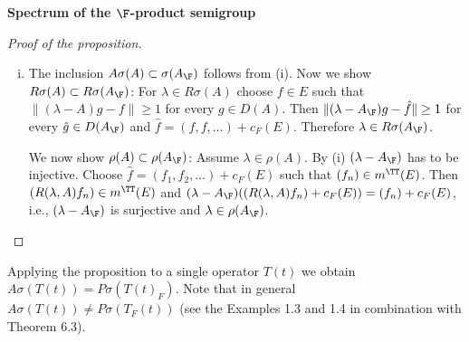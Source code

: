 \begin{example}{\textbf{Spectrum of the $\F$-product semigroup}}
\begin{proof}[Proof of the proposition]
\begin{enumerate}[(i), wide]
By the considerations in A-I,3.6 we can represent each $\hat{f}^{m}$ as a normalized sequence $(f_{n}^{m})_{n \in \N}$ in $D(A)$ such that
\[
\lim_{m \to \infty} \limsup_{n \to \infty} \|(\lambda-A)f_{n}^{m}\| = 0
\]

Therefore we can find a sequence $g_{k} = f_{k}^{m(k)}$ satisfying
\[
\lim_{k \to \infty} \|(\lambda-A)g_{k}\| = 0
\]
i.e. $\lambda \in A\sigma(A)$.

Finally we show $A\sigma(A) \subset P\sigma(A_{\F})$: For $\lambda \in A\sigma(A)$ take a corresponding approximate eigenvector $(f_{n})$.
By A-I,(3.2) we have
\begin{align*}
\|T(t)f_{n} - f_{n}\| &\leq \|T(t)f_{n} - e^{\lambda t}f_{n}\| + |e^{\lambda t} - 1| \\
&= \|\int_{0}^{t} e^{\lambda(t-s)}T(s)(\lambda-A)f_{n} \, \ds\| + |e^{\lambda t} -1|
\end{align*}
which converges to zero uniformly in $n$ as $t \to 0$, i.e. $(f_{n}) \in m^{\TT}(E)$.
From the characterization of $D(A_{\F})$ given in A-I,3.6 it follows that
\[
\hat{f} \coloneqq (f_{n}) + c_{F}(E) \in D(A_{\F})
\]
and $A_{\F}\hat{f} = \lambda\hat{f}$, i.e. $\lambda \in P\sigma(A_{\F})$~.

\item 
The inclusion $A\sigma(A) \subset \sigma(A_{\F})$ follows from (i). Now we show $R\sigma(A) \subset R\sigma(A_{\F})$:
For $\lambda \in R\sigma(A)$ choose $f \in E$ such that $\|(\lambda-A)g - f\| \geq 1$ for every $g \in D(A)$.
Then $\|(\lambda-A_{\F})g - \hat{f}\| \geq 1$ for every $\hat{g} \in D(A_{\F})$ and $\hat{f} = (f,f,\ldots) + c_{F}(E)$.
Therefore $\lambda \in R\sigma(A_{\F})$.

We now show $\rho(A) \subset \rho(A_{\F})$: Assume $\lambda \in \rho(A)$.
By (i) $(\lambda-A_{\F})$ has to be injective.
Choose $\hat{f} = (f_{1},f_{2},\ldots) + c_{F}(E)$ such that $(f_{n}) \in m^{\TT}(E)$.
Then $(R(\lambda,A)f_{n}) \in m^{\TT}(E)$ and $(\lambda-A_{\F})((R(\lambda,A)f_{n})+c_{F}(E)) = (f_{n}) + c_{F}(E)$, i.e., $(\lambda-A_{\F})$ is surjective and $\lambda \in \rho(A_{\F})$.
\end{enumerate}
\end{proof}

Applying the proposition to a single operator $T(t)$ we obtain
\newline
$A\sigma(T(t)) = P\sigma(T(t)_{F})$.
Note that in general $A\sigma(T(t)) \neq P\sigma(T_{F}(t))$ (see the Examples 1.3 and 1.4 in combination with Theorem 6.3).
\end{example}

